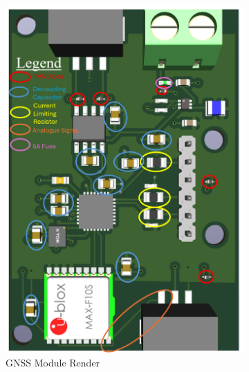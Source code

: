 \begin{figure}[htbp]
  \centering
  \begin{subfigure}[b]{0.48\textwidth}
    \includegraphics[width=\textwidth]{figs/Thomas/Custom Hardware/GPS render.png}
    \caption{GNSS Module Render}
    \label{fig:gnss_render}
  \end{subfigure}
  \hfill
  \begin{subfigure}[b]{0.48\textwidth}

\end{subfigure}
\end{figure}
